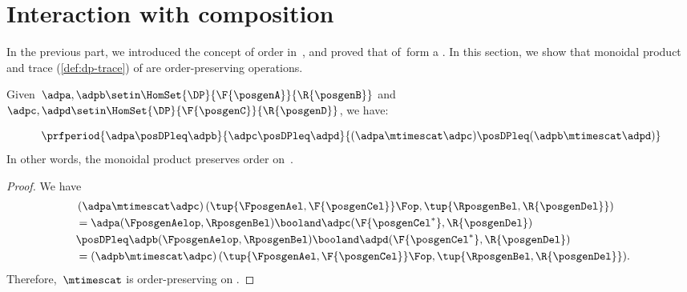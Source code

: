 
\section{Interaction with composition}
In the previous part, we introduced the concept of order in~\DP, and proved that  of~\DP form a .
In this section, we show that monoidal product and trace (\cref{def:dp-trace}) of  are order-preserving operations.


\begin{lemma}
    \label{lem:tens_pres_order}
    Given~$\adpa,\adpb \setin \HomSet{\DP}{\F{\posgenA}}{\R{\posgenB}}$ and~$\adpc,\adpd \setin \HomSet{\DP}{\F{\posgenC}}{\R{\posgenD}}$, we have:

    \begin{equation}
        \prfperiod{
            \adpa\posDPleq \adpb
        }{
            \adpc\posDPleq \adpd
        }{
            (\adpa\mtimescat \adpc )\posDPleq (\adpb\mtimescat \adpd)
        }
    \end{equation}
    In other words, the monoidal product preserves order on~\DP.
\end{lemma}

\begin{proof}
    We have
    \begin{equation}
        \label{eq:tens_pres_ord}
        \begin{aligned}
            ~ & \left( \adpa\mtimescat \adpc\right) (\tup{\FposgenAel,\F{\posgenCel}}\Fop,\tup{\RposgenBel,\R{\posgenDel}}) \\
              & = \adpa(\FposgenAelop,\RposgenBel)\booland \adpc(\F{\posgenCel^*},\R{\posgenDel}) \\
              & \posDPleq \adpb(\FposgenAelop,\RposgenBel)\booland \adpd(\F{\posgenCel^*},\R{\posgenDel}) \\
              & =\left( \adpb\mtimescat \adpc\right) (\tup{\FposgenAel,\F{\posgenCel}}\Fop,\tup{\RposgenBel,\R{\posgenDel}}).
        \end{aligned}
    \end{equation}
    Therefore,~$\mtimescat$ is order-preserving on \DP.
\end{proof}

